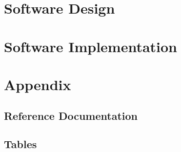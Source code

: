 \documentclass[11pt]{article}
\begin{document}
\section{Software Design}

\section{Software Implementation}

\section{Appendix}
\subsection{Reference Documentation}
\subsection{Tables}
\listoftables
\end{document}
